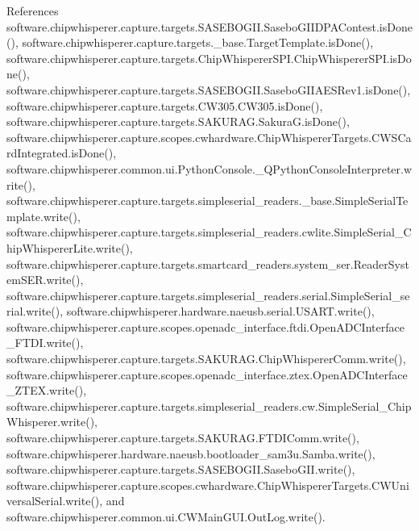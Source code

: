 References software.\+chipwhisperer.\+capture.\+targets.\+S\+A\+S\+E\+B\+O\+G\+I\+I.\+Sasebo\+G\+I\+I\+D\+P\+A\+Contest.\+is\+Done(), software.\+chipwhisperer.\+capture.\+targets.\+\_\+base.\+Target\+Template.\+is\+Done(), software.\+chipwhisperer.\+capture.\+targets.\+Chip\+Whisperer\+S\+P\+I.\+Chip\+Whisperer\+S\+P\+I.\+is\+Done(), software.\+chipwhisperer.\+capture.\+targets.\+S\+A\+S\+E\+B\+O\+G\+I\+I.\+Sasebo\+G\+I\+I\+A\+E\+S\+Rev1.\+is\+Done(), software.\+chipwhisperer.\+capture.\+targets.\+C\+W305.\+C\+W305.\+is\+Done(), software.\+chipwhisperer.\+capture.\+targets.\+S\+A\+K\+U\+R\+A\+G.\+Sakura\+G.\+is\+Done(), software.\+chipwhisperer.\+capture.\+scopes.\+cwhardware.\+Chip\+Whisperer\+Targets.\+C\+W\+S\+Card\+Integrated.\+is\+Done(), software.\+chipwhisperer.\+common.\+ui.\+Python\+Console.\+\_\+\+Q\+Python\+Console\+Interpreter.\+write(), software.\+chipwhisperer.\+capture.\+targets.\+simpleserial\+\_\+readers.\+\_\+base.\+Simple\+Serial\+Template.\+write(), software.\+chipwhisperer.\+capture.\+targets.\+simpleserial\+\_\+readers.\+cwlite.\+Simple\+Serial\+\_\+\+Chip\+Whisperer\+Lite.\+write(), software.\+chipwhisperer.\+capture.\+targets.\+smartcard\+\_\+readers.\+system\+\_\+ser.\+Reader\+System\+S\+E\+R.\+write(), software.\+chipwhisperer.\+capture.\+targets.\+simpleserial\+\_\+readers.\+serial.\+Simple\+Serial\+\_\+serial.\+write(), software.\+chipwhisperer.\+hardware.\+naeusb.\+serial.\+U\+S\+A\+R\+T.\+write(), software.\+chipwhisperer.\+capture.\+scopes.\+openadc\+\_\+interface.\+ftdi.\+Open\+A\+D\+C\+Interface\+\_\+\+F\+T\+D\+I.\+write(), software.\+chipwhisperer.\+capture.\+targets.\+S\+A\+K\+U\+R\+A\+G.\+Chip\+Whisperer\+Comm.\+write(), software.\+chipwhisperer.\+capture.\+scopes.\+openadc\+\_\+interface.\+ztex.\+Open\+A\+D\+C\+Interface\+\_\+\+Z\+T\+E\+X.\+write(), software.\+chipwhisperer.\+capture.\+targets.\+simpleserial\+\_\+readers.\+cw.\+Simple\+Serial\+\_\+\+Chip\+Whisperer.\+write(), software.\+chipwhisperer.\+capture.\+targets.\+S\+A\+K\+U\+R\+A\+G.\+F\+T\+D\+I\+Comm.\+write(), software.\+chipwhisperer.\+hardware.\+naeusb.\+bootloader\+\_\+sam3u.\+Samba.\+write(), software.\+chipwhisperer.\+capture.\+targets.\+S\+A\+S\+E\+B\+O\+G\+I\+I.\+Sasebo\+G\+I\+I.\+write(), software.\+chipwhisperer.\+capture.\+scopes.\+cwhardware.\+Chip\+Whisperer\+Targets.\+C\+W\+Universal\+Serial.\+write(), and software.\+chipwhisperer.\+common.\+ui.\+C\+W\+Main\+G\+U\+I.\+Out\+Log.\+write().


